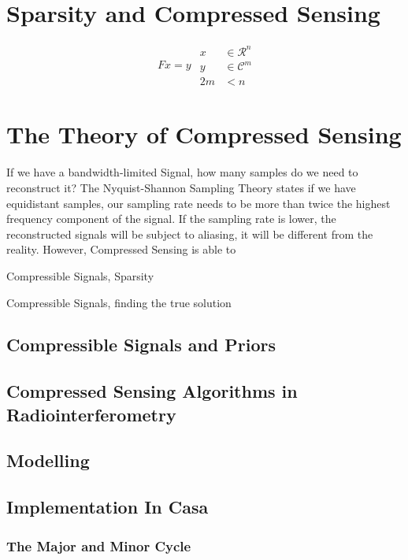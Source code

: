 \section{Sparsity and Compressed Sensing}

\begin{equation}\label{intro:underdetermined}
\begin{split}
Fx = y
\end{split}
\begin{split}
x &\in \mathcal{R}^n\\
y &\in \mathcal{C}^m\\
2m &< n
\end{split}
\end{equation}

\section{The Theory of Compressed Sensing} \label{cs}


If we have a bandwidth-limited Signal, how many samples do we need to reconstruct it? The Nyquist-Shannon Sampling Theory states if we have equidistant samples, our sampling rate needs to be more than twice the highest frequency component of the signal. If the sampling rate is lower, the reconstructed signals will be subject to aliasing, it will be different from the reality. However, Compressed Sensing is able to 

Compressible Signals, Sparsity


Compressible Signals, finding the true solution

\subsection{Compressible Signals and Priors}


\subsection{Compressed Sensing Algorithms in Radiointerferometry}

\subsection{Modelling}

\subsection{Implementation In Casa}

\subsubsection{The Major and Minor Cycle}
